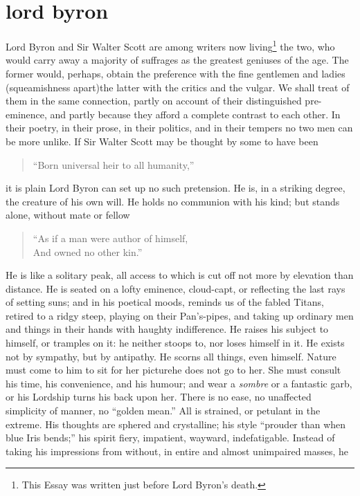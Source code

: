\chapter[Lord Byron]{lord byron} %

Lord Byron and Sir Walter Scott are among writers now living\footnote{This Essay was written just before Lord Byron's death.} the two,
who would carry away a majority of suffrages as the greatest geniuses of
the age. The former would, perhaps, obtain the preference with the fine
gentlemen and ladies (squeamishness apart)\textemdash the latter with the critics
and the vulgar. We shall treat of them in the same connection, partly
on account of their distinguished pre-eminence, and partly because they
afford a complete contrast to each other. In their poetry, in their
prose, in their politics, and in their tempers no two men can be more
unlike. If Sir Walter Scott may be thought by some to have been
\begin{quote}
  ``Born universal heir to all humanity,''
\end{quote}
it is plain Lord Byron can set up no such pretension. He is, in a
striking degree, the creature of his own will. He holds no communion
with his kind; but stands alone, without mate or fellow\textemdash 
\begin{quote}
  ``As if a man were author of himself, \\
  And owned no other kin.''
\end{quote}
He is like a solitary peak, all access to which is cut off not more by
elevation than distance. He is seated on a lofty eminence, cloud-capt,
or reflecting the last rays of setting suns; and in his poetical moods,
reminds us of the fabled Titans, retired to a ridgy steep, playing on
their Pan's-pipes, and taking up ordinary men and things in their hands
with haughty indifference. He raises his subject to himself, or tramples
on it: he neither stoops to, nor loses himself in it. He exists not by
sympathy, but by antipathy. He scorns all things, even himself. Nature
must come to him to sit for her picture\textemdash he does not go to her. She must
consult his time, his convenience, and his humour; and wear a \emph{sombre}
or a fantastic garb, or his Lordship turns his back upon her. There is
no ease, no unaffected simplicity of manner, no ``golden mean.'' All is
strained, or petulant in the extreme. His thoughts are sphered and
crystalline; his style ``prouder than when blue Iris bends;'' his spirit
fiery, impatient, wayward, indefatigable. Instead of taking his
impressions from without, in entire and almost unimpaired masses, he
